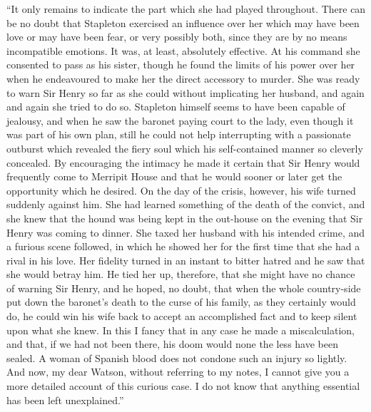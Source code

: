 \documentclass[paper=5.5in:8.5in,BCOR=7mm,twoside,DIV=calc,12pt,usegeometry,openany,chapterprefix,endperiod,headings=big]{scrbook} %
\begin{document}



\enquote{It only remains to indicate the part which she had played \newline throughout. There can be no doubt that Stapleton exercised an influence over her which may have been love or may have been fear, or very possibly both, since they are by no means incompatible emotions. It was, at least, absolutely effective. At his command she consented to pass as his sister, though he found the limits of his power over her when he endeavoured to make her the direct accessory to murder. She was ready to warn Sir Henry so far as she could without implicating her husband, and again and again she tried to do so. Stapleton himself seems to have been capable of jealousy, and when he saw the baronet paying court to the lady, even though it was part of his own plan, still he could not help interrupting with a passionate outburst which revealed the fiery soul which his self-contained manner so cleverly concealed. By encouraging the intimacy he made it certain that Sir Henry would frequently come to Merripit House and that he would sooner or later get the opportunity which he desired. On the day of the crisis, however, his wife turned suddenly against him. She had learned something of the death of the convict, and she knew that the hound was being kept in the out-house on the evening that Sir Henry was coming to dinner. She taxed her husband with his intended crime, and a furious scene followed, in which he showed her for the first time that she had a rival in his love. Her fidelity turned in an instant to bitter hatred and he saw that she would betray him. He tied her up, therefore, that she might have no chance of warning Sir Henry, and he hoped, no doubt, that when the whole country-side put down the baronet's death to the curse of his family, as they certainly would do, he could win his wife back to accept an accomplished fact and to keep silent upon what she knew. In this I fancy that in any case he made a miscalculation, and that, if we had not been there, his doom would none the less have been sealed. A woman of Spanish blood does not condone such an injury so lightly. And now, my dear Watson, without referring to my notes, I cannot give you a more detailed account of this curious case. I do not know that anything essential has been left unexplained.}
\end{document}
